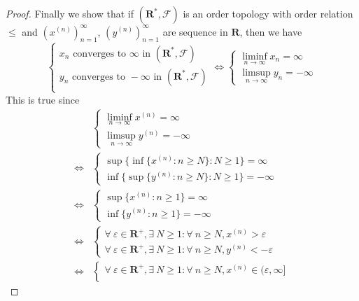 \begin{proof}
    Finally we show that if  \((\mathbf{R}^*, \mathcal{F})\) is an order topology with order relation \(\leq\) and \((x^{(n)})_{n = 1}^\infty\), \((y^{(n)})_{n = 1}^\infty\) are sequence in \(\mathbf{R}\), then we have
    \[
        \begin{cases}
            x_n \text{ converges to } \infty \text{ in } (\mathbf{R}^*, \mathcal{F})  \\
            y_n \text{ converges to } -\infty \text{ in } (\mathbf{R}^*, \mathcal{F}) \\
        \end{cases} \iff \begin{cases}
            \liminf_{n \to \infty} x_n = \infty \\
            \limsup_{n \to \infty} y_n = -\infty
        \end{cases}
    \]
    This is true since
    \begin{align*}
             & \begin{cases}
            \liminf_{n \to \infty} x^{(n)} = \infty \\
            \limsup_{n \to \infty} y^{(n)} = -\infty
        \end{cases}  \\
        \iff & \begin{cases}
            \sup\big\{\inf\{x^{(n)} : n \geq N\} : N \geq 1\big\} = \infty \\
            \inf\big\{\sup\{y^{(n)} : n \geq N\} : N \geq 1\big\} = -\infty
        \end{cases}  \\
        \iff & \begin{cases}
            \sup\{x^{(n)} : n \geq 1\} = \infty \\
            \inf\{y^{(n)} : n \geq 1\} = -\infty
        \end{cases}  \\
        \iff & \begin{cases}
            \forall\ \varepsilon \in \mathbf{R}^+, \exists\ N \geq 1 : \forall\ n \geq N, x^{(n)} > \varepsilon \\
            \forall\ \varepsilon \in \mathbf{R}^+, \exists\ N \geq 1 : \forall\ n \geq N, y^{(n)} < -\varepsilon
        \end{cases}  \\
        \iff & \begin{cases}
            \forall\ \varepsilon \in \mathbf{R}^+, \exists\ N \geq 1 : \forall\ n \geq N, x^{(n)} \in (\varepsilon, \infty] \\

\end{cases}
\end{align*}
\end{proof}
